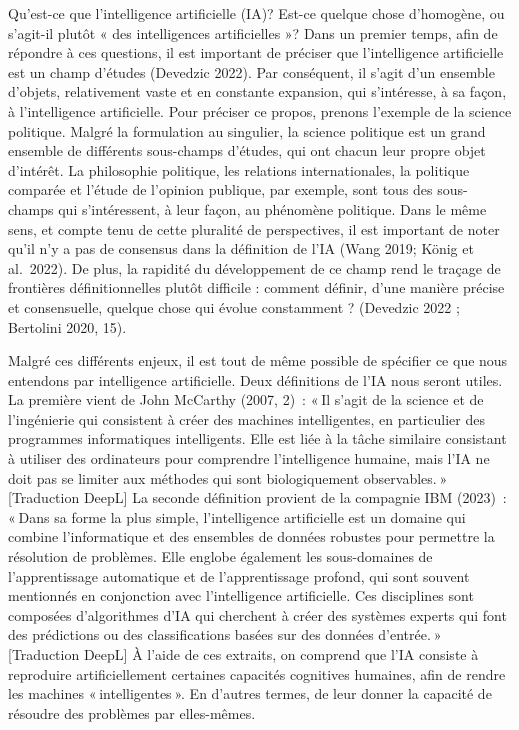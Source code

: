 \documentclass[
  letterpaper,
]{scrbook}
\begin{document}
Qu'est-ce que l'intelligence artificielle (IA)? Est-ce quelque chose
d'homogène, ou s'agit-il plutôt « des intelligences artificielles »?
Dans un premier temps, afin de répondre à ces questions, il est
important de préciser que l'intelligence artificielle est un champ
d'études (Devedzic 2022). Par conséquent, il s'agit d'un ensemble
d'objets, relativement vaste et en constante expansion, qui s'intéresse,
à sa façon, à l'intelligence artificielle. Pour préciser ce propos,
prenons l'exemple de la science politique. Malgré la formulation au
singulier, la science politique est un grand ensemble de différents
sous-champs d'études, qui ont chacun leur propre objet d'intérêt. La
philosophie politique, les relations internationales, la politique
comparée et l'étude de l'opinion publique, par exemple, sont tous des
sous-champs qui s'intéressent, à leur façon, au phénomène politique.
Dans le même sens, et compte tenu de cette pluralité de perspectives, il
est important de noter qu'il n'y a pas de consensus dans la définition
de l'IA (Wang 2019; König et al.~2022). De plus, la rapidité du
développement de ce champ rend le traçage de frontières définitionnelles
plutôt difficile : comment définir, d'une manière précise et
consensuelle, quelque chose qui évolue constamment ? (Devedzic 2022 ;
Bertolini 2020, 15).

Malgré ces différents enjeux, il est tout de même possible de spécifier
ce que nous entendons par intelligence artificielle. Deux définitions de
l'IA nous seront utiles. La première vient de John McCarthy (2007, 2)~:
« Il s'agit de la science et de l'ingénierie qui consistent à créer des
machines intelligentes, en particulier des programmes informatiques
intelligents. Elle est liée à la tâche similaire consistant à utiliser
des ordinateurs pour comprendre l'intelligence humaine, mais l'IA ne
doit pas se limiter aux méthodes qui sont biologiquement observables. »
{[}Traduction DeepL{]} La seconde définition provient de la compagnie
IBM (2023)~: « Dans sa forme la plus simple, l'intelligence artificielle
est un domaine qui combine l'informatique et des ensembles de données
robustes pour permettre la résolution de problèmes. Elle englobe
également les sous-domaines de l'apprentissage automatique et de
l'apprentissage profond, qui sont souvent mentionnés en conjonction avec
l'intelligence artificielle. Ces disciplines sont composées
d'algorithmes d'IA qui cherchent à créer des systèmes experts qui font
des prédictions ou des classifications basées sur des données
d'entrée. » {[}Traduction DeepL{]} À l'aide de ces extraits, on comprend
que l'IA consiste à reproduire artificiellement certaines capacités
cognitives humaines, afin de rendre les machines « intelligentes ». En
d'autres termes, de leur donner la capacité de résoudre des problèmes
par elles-mêmes.
\end{document}

